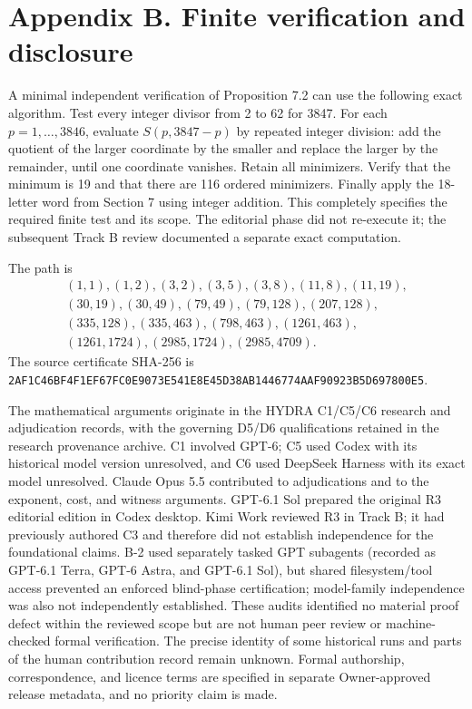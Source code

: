 \documentclass[11pt]{article}
\begin{document}
\section*{Appendix B. Finite verification and disclosure}

A minimal independent verification of Proposition 7.2 can use the following exact algorithm. Test every integer divisor from 2 to 62 for 3847. For each \(p=1,\ldots,3846\), evaluate \(S(p,3847-p)\) by repeated integer division: add the quotient of the larger coordinate by the smaller and replace the larger by the remainder, until one coordinate vanishes. Retain all minimizers. Verify that the minimum is 19 and that there are 116 ordered minimizers. Finally apply the 18-letter word from Section 7 using integer addition. This completely specifies the required finite test and its scope. The editorial phase did not re-execute it; the subsequent Track B review documented a separate exact computation.

The path is
\[
\begin{gathered}
(1,1),(1,2),(3,2),(3,5),(3,8),(11,8),(11,19),\\
(30,19),(30,49),(79,49),(79,128),(207,128),\\
(335,128),(335,463),(798,463),(1261,463),\\
(1261,1724),(2985,1724),(2985,4709).
\end{gathered}
\]
The source certificate SHA-256 is \texttt{2AF1C46BF4F1EF67\allowbreak FC0E9073E541E8E4\allowbreak 5D38AB1446774AAF\allowbreak 90923B5D697800E5}.

The mathematical arguments originate in the HYDRA C1/C5/C6 research and adjudication records, with the governing D5/D6 qualifications retained in the research provenance archive. C1 involved GPT-6; C5 used Codex with its historical model version unresolved, and C6 used DeepSeek Harness with its exact model unresolved. Claude Opus 5.5 contributed to adjudications and to the exponent, cost, and witness arguments. GPT-6.1 Sol prepared the original R3 editorial edition in Codex desktop. Kimi Work reviewed R3 in Track B; it had previously authored C3 and therefore did not establish independence for the foundational claims. B-2 used separately tasked GPT subagents (recorded as GPT-6.1 Terra, GPT-6 Astra, and GPT-6.1 Sol), but shared filesystem/tool access prevented an enforced blind-phase certification; model-family independence was also not independently established. These audits identified no material proof defect within the reviewed scope but are not human peer review or machine-checked formal verification. The precise identity of some historical runs and parts of the human contribution record remain unknown. Formal authorship, correspondence, and licence terms are specified in separate Owner-approved release metadata, and no priority claim is made.
\end{document}
